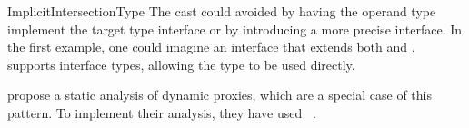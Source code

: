\begin{pattern}{ImplicitIntersectionType}
\issues{}
The cast could avoided by having the operand type implement the target type
interface or by introducing a more precise interface.
In the first example,
one could imagine an interface  that extends both
 and .
\scala{} supports interface types,
allowing the type  to be used directly.

\cite{fourtounisStaticAnalysisJava2018} propose a static analysis of dynamic proxies,
which are a special case of this pattern.
To implement their analysis,
they have used \doop{}~\citep{bravenboerExceptionAnalysisPointsto}.

\end{pattern}
